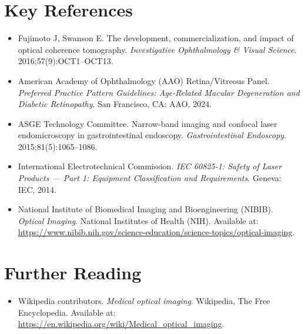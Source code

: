 \section{Key References}
\begin{itemize}
  \item Fujimoto J, Swanson E. The development, commercialization, and impact of optical coherence tomography. \textit{Investigative Ophthalmology \& Visual Science}. 2016;57(9):OCT1--OCT13.
  \item American Academy of Ophthalmology (AAO) Retina/Vitreous Panel. \textit{Preferred Practice Pattern Guidelines: Age-Related Macular Degeneration and Diabetic Retinopathy}. San Francisco, CA: AAO, 2024.
  \item ASGE Technology Committee. Narrow-band imaging and confocal laser endomicroscopy in gastrointestinal endoscopy. \textit{Gastrointestinal Endoscopy}. 2015;81(5):1065--1086.
  \item International Electrotechnical Commission. \textit{IEC 60825-1: Safety of Laser Products --- Part 1: Equipment Classification and Requirements}. Geneva: IEC, 2014.
  \item National Institute of Biomedical Imaging and Bioengineering (NIBIB). \textit{Optical Imaging}. National Institutes of Health (NIH). Available at: \url{https://www.nibib.nih.gov/science-education/science-topics/optical-imaging}.
\end{itemize}

\section{Further Reading}
\begin{itemize}
  \item Wikipedia contributors. \textit{Medical optical imaging}. Wikipedia, The Free Encyclopedia. Available at: \url{https://en.wikipedia.org/wiki/Medical_optical_imaging}.
\end{itemize}
